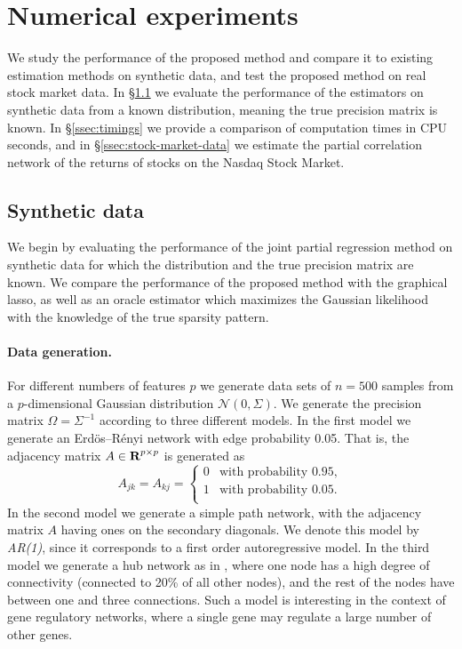 \documentclass{article}
\begin{document}
\section{Numerical experiments} 

We study the performance of the proposed method
and compare it to existing estimation methods on synthetic data, and test the
proposed method on real stock market data. In \S\ref{sec:synthetic-data} we
evaluate the performance of the estimators on synthetic data from a known
distribution, meaning the true precision matrix is known. In
\S\ref{ssec:timings} we provide a comparison of computation times in CPU
seconds, and in \S\ref{ssec:stock-market-data} we estimate the partial
correlation network of the returns of stocks on the Nasdaq Stock Market.

\subsection{Synthetic data}\label{sec:synthetic-data}
We begin by evaluating the performance of the joint partial regression method on
synthetic data for which the distribution and the true precision matrix are known.
We compare the performance of the proposed method with the graphical lasso,
as well as an oracle estimator which maximizes the Gaussian likelihood with the 
knowledge of the true sparsity pattern. 

\paragraph{Data generation.} For different numbers of features $p$ we generate
data sets of $n=500$ samples from a $p$-dimensional Gaussian distribution
$\mathcal{N}(0, \Sigma)$. We generate the precision matrix $\Omega =
\Sigma^{-1}$ according to three different models. In the first model we
generate an Erdös--Rényi network  with edge probability 0.05. That is, the
adjacency matrix $A \in {\mbox{\bf R}}^{p\times p}$ is generated as
\[
    A_{jk} = A_{kj} = \begin{cases}
        0 & \text{with probability } 0.95,\\
        1 & \text{with probability } 0.05. \\
    \end{cases}
\]
In the second model we generate a simple path network, with the adjacency
matrix $A$ having ones on the secondary diagonals. We denote this model by
\emph{AR(1)}, since it corresponds to a first order autoregressive model. In
the third model we generate a hub network as in \cite{Peng09}, where one node
has a high degree of connectivity (connected to 20\% of all other nodes), and
the rest of the nodes have between one and three connections. Such a model is
interesting in the context of gene regulatory networks, where a single gene may
regulate a large number of other genes.
\end{document}
